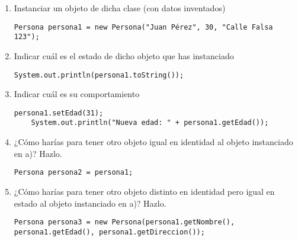 \documentclass[a4paper,12pt]{article}
\begin{document}
\begin{enumerate}
    \item Instanciar un objeto de dicha clase (con datos inventados)
    \begin{lstlisting}[style=customjava]
    Persona persona1 = new Persona("Juan Pérez", 30, "Calle Falsa 123");
    \end{lstlisting}

    \item Indicar cuál es el estado de dicho objeto que has instanciado
    \begin{lstlisting}[style=customjava]
    System.out.println(persona1.toString());
    \end{lstlisting}

    \item Indicar cuál es su comportamiento
    \begin{lstlisting}[style=customjava]
    persona1.setEdad(31);
    System.out.println("Nueva edad: " + persona1.getEdad());
    \end{lstlisting}

    \item ¿Cómo harías para tener otro objeto igual en identidad al objeto instanciado en a)? Hazlo.
    \begin{lstlisting}[style=customjava]
    Persona persona2 = persona1;
    \end{lstlisting}

    \item ¿Cómo harías para tener otro objeto distinto en identidad pero igual en estado al objeto instanciado en a)? Hazlo.
    \begin{lstlisting}[style=customjava]
    Persona persona3 = new Persona(persona1.getNombre(), persona1.getEdad(), persona1.getDireccion());
    \end{lstlisting}
\end{enumerate}
\end{document}
